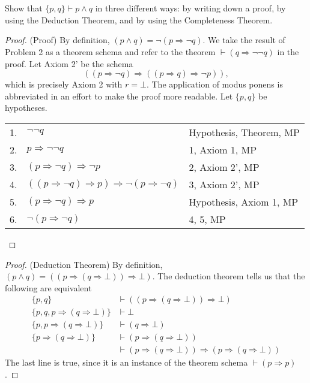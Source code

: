 \documentclass[12pt]{article}
\newenvironment{problem}
    {\begin{lrbox}{\mybox}\begin{minipage}{0.98\textwidth}}
    {\end{minipage}\end{lrbox}\begin{center}\framebox[\textwidth]{\usebox{\mybox}}\end{center}}
\renewcommand{\implies}{\Rightarrow}
\newcommand{\proves}{\vdash}
\begin{document}
\newpage
\section{}
\begin{problem}
    Show that $\{p, q\} \proves p \land q$ in three different ways: by writing down a proof, by using the Deduction Theorem, and by using the Completeness Theorem.
\end{problem}

\begin{proof} (Proof)
    By definition, $(p \land q) = \lnot(p \implies \lnot q)$. We take the result of Problem 2 as a theorem schema and refer to the theorem $\proves (q \implies \lnot \lnot q)$ in the proof. Let Axiom 2' be the schema
    \[
        ((p \implies \lnot q) \implies ((p \implies q) \implies \lnot p)),
    \]
    which is precisely Axiom 2 with $r = \bot$. The application of modus ponens is abbreviated in an effort to make the proof more readable. Let $\{p, q\}$ be hypotheses.
    \begin{center}
        \begin{tabular}{r l l}
            1. & $\lnot \lnot q$ & Hypothesis, Theorem, MP \\
            2. & $p \implies \lnot \lnot q$ & 1, Axiom 1, MP \\
            3. & $(p \implies \lnot q) \implies \lnot p$ & 2, Axiom 2', MP \\
            4. & $((p \implies \lnot q) \implies p) \implies \lnot(p \implies \lnot q)$ & 3, Axiom 2', MP \\
            5. & $(p \implies \lnot q) \implies p$ & Hypothesis, Axiom 1, MP \\
            6. & $\lnot(p \implies \lnot q)$ & 4, 5, MP
        \end{tabular}
    \end{center}
    
\end{proof}

\begin{proof}(Deduction Theorem)
    By definition, $(p \land q) = ((p \implies (q \implies \bot)) \implies \bot)$. The deduction theorem tells us that the following are equivalent
    \begin{align*}
        \{p, q\} &\proves ((p \implies (q \implies \bot)) \implies \bot) \\
        \{p, q, p \implies (q \implies \bot)\} &\proves \bot \\
        \{p, p \implies (q \implies \bot)\} &\proves (q \implies \bot) \\
        \{p \implies (q \implies \bot)\} &\proves (p \implies (q \implies \bot)) \\
        &\proves (p \implies (q \implies \bot)) \implies (p \implies (q \implies \bot))
    \end{align*}
    The last line is true, since it is an instance of the theorem schema $\proves (p \implies p)$.
    
\end{proof}
\end{document}
